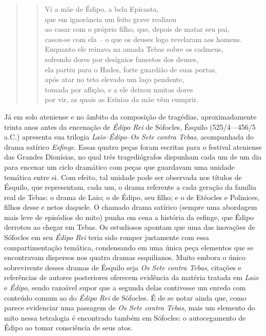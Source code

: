 \begin{quote}
\begin{verse}
Vi a mãe de Édipo, a bela Epicasta,\\
que em ignorância um feito grave realizou\\
ao casar com o próprio filho, que,\qb{} depois de matar seu pai,\\
casou-se com ela -- o que os deuses\qb{} logo revelaram aos homens.\\
Enquanto ele reinava na amada Tebas\qb{} sobre os cadmeus,\\
sofrendo dores por desígnios\qb{} funestos dos deuses,\\
ela partiu para o Hades,\qb{} forte guardião de suas portas,\\
após atar no teto elevado um laço pendente,\\
tomada por aflição, e a ele\qb{} deixou muitas dores\\
por vir, as quais as Erínias da mãe\qb{} vêm cumprir.
\end{verse}
\end{quote}


Já em solo ateniense e no âmbito da composição de tragédias,
aproximadamente trinta anos antes da encenação de \emph{Édipo Rei} de
Sófocles, Ésquilo (525/4---456/5 a.C.) apresenta sua trilogia
\emph{Laio}--\emph{Édipo}--\emph{Os Sete contra Tebas}, acompanhada
do drama satírico \emph{Esfinge}. Essas quatro peças foram escritas para
o festival ateniense das Grandes Dionísias, no qual três tragediógrafos
dispunham cada um de um dia para encenar um ciclo dramático com peças
que guardavam uma unidade temática entre si. Com efeito, tal unidade
pode ser observada nos títulos de Ésquilo, que representam, cada um, o
drama referente a cada geração da família real de Tebas: o drama de
Laio; o de Édipo, seu filho; e o de Etéocles e Polinices, filhos desse e
netos daquele. O chamado drama satírico (sempre uma abordagem mais leve
de episódios do mito) punha em cena a história da esfinge, que Édipo
derrotou ao chegar em Tebas. Os estudiosos apontam que uma das inovações
de Sófocles em seu \emph{Édipo Rei} teria sido romper justamente com
essa compartimentação temática, condensando em uma única peça elementos
que se encontravam dispersos nos quatro dramas esquilianos. Muito embora
o único sobrevivente desses dramas de Ésquilo seja \emph{Os Sete contra
Tebas}, citações e referências de autores posteriores oferecem evidência
da matéria tratada em \emph{Laio} e \emph{Édipo}, sendo razoável supor
que a segunda delas contivesse um enredo com conteúdo comum ao do
\emph{Édipo Rei} de Sófocles. É de se notar ainda que, como parece
evidenciar uma passagem de \emph{Os Sete contra Tebas}, mais um elemento
do mito nessa tetralogia é encontrado também em Sófocles: o
autocegamento de Édipo ao tomar consciência de seus atos.


